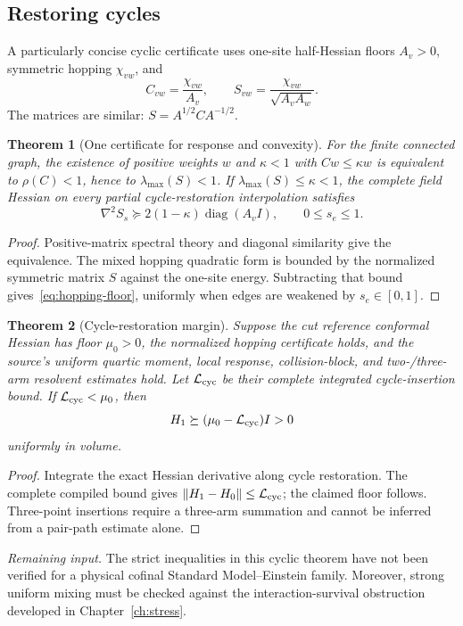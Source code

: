\documentclass[11pt,a4paper,oneside]{book}
\theoremstyle{plain}
\newtheorem{theorem}{Theorem}[chapter]
\theoremstyle{definition}
\theoremstyle{remark}
\newcommand{\diag}{\operatorname{diag}}
\newcommand{\norm}[1]{\left\lVert#1\right\rVert}
\newcommand{\src}[2]{\cite{#1}}
\newcommand{\gate}[1]{\par\smallskip\noindent\textit{Remaining input.} #1\par\smallskip}
\begin{document}
\subsection{Restoring cycles}

A particularly concise cyclic certificate uses one-site half-Hessian floors $A_v>0$, symmetric hopping $\chi_{vw}$, and
\begin{equation}
 C_{vw}=\frac{\chi_{vw}}{A_v},\qquad
 S_{vw}=\frac{\chi_{vw}}{\sqrt{A_vA_w}}.
 \label{eq:normalized-hopping}
\end{equation}
The matrices are similar: $S=A^{1/2}CA^{-1/2}$.

\begin{theorem}[One certificate for response and convexity]
\label{thm:hopping}
For the finite connected graph, the existence of positive weights $w$ and $\kappa<1$ with $Cw\le\kappa w$ is equivalent to $\rho(C)<1$, hence to $\lambda_{\max}(S)<1$. If $\lambda_{\max}(S)\le\kappa<1$, the complete field Hessian on every partial cycle-restoration interpolation satisfies
\begin{equation}
 \nabla^2S_s\succeq2(1-\kappa)\diag(A_vI),\qquad0\le s_e\le1.
 \label{eq:hopping-floor}
\end{equation}
\end{theorem}
\begin{proof}
Positive-matrix spectral theory and diagonal similarity give the equivalence. The mixed hopping quadratic form is bounded by the normalized symmetric matrix $S$ against the one-site energy. Subtracting that bound gives~\eqref{eq:hopping-floor}, uniformly when edges are weakened by $s_e\in[0,1]$.
\end{proof}
\src{R18}{thm:v18v33-equivalence,thm:v18v33-convexity}

\begin{theorem}[Cycle-restoration margin]
\label{thm:cycle-restoration}
Suppose the cut reference conformal Hessian has floor $\mu_0>0$, the normalized hopping certificate holds, and the source's uniform quartic moment, local response, collision-block, and two-/three-arm resolvent estimates hold. Let $\mathcal L_{\rm cyc}$ be their complete integrated cycle-insertion bound. If $\mathcal L_{\rm cyc}<\mu_0$, then
\begin{equation}
 H_1\succeq(\mu_0-\mathcal L_{\rm cyc})I>0
 \label{eq:cycle-margin}
\end{equation}
uniformly in volume.
\end{theorem}
\begin{proof}
Integrate the exact Hessian derivative along cycle restoration. The complete compiled bound gives $\norm{H_1-H_0}\le\mathcal L_{\rm cyc}$; the claimed floor follows. Three-point insertions require a three-arm summation and cannot be inferred from a pair-path estimate alone.
\end{proof}
\src{R18}{thm:v18v34-cycle-margin}
\gate{The strict inequalities in this cyclic theorem have not been verified for a physical cofinal Standard Model--Einstein family. Moreover, strong uniform mixing must be checked against the interaction-survival obstruction developed in Chapter~\ref{ch:stress}.}
\end{document}
